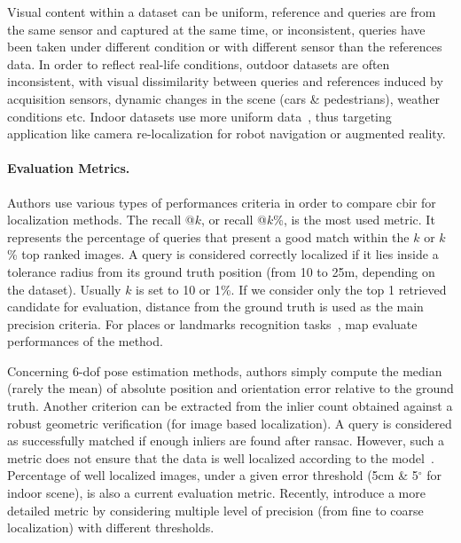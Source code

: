 		Visual content within a dataset can be uniform, reference and queries are from the same sensor and captured at the same time, or inconsistent, queries have been taken under different condition or with different sensor than the references data. In order to reflect real-life conditions, outdoor datasets are often inconsistent, with visual dissimilarity between queries and references induced by acquisition sensors, dynamic changes in the scene (cars \& pedestrians),  weather conditions etc. Indoor datasets use more uniform data~\citep{Shotton2013}, thus targeting application like camera re-localization for robot navigation or augmented reality.

		\paragraph{Evaluation Metrics.}
		\label{subsec:evaluation_metric}
			Authors use various types of performances criteria in order to compare \ac{cbir} for localization methods. The recall @$k$, or recall @$k$\%, is the most used metric. It represents the percentage of queries that present a good match within the $k$ or $k$\% top ranked images. A query is considered correctly localized if it lies inside a tolerance radius from its ground truth position (from 10 to 25m, depending on the dataset).  Usually $k$ is set to 10 or 1\%. If we consider only the top 1 retrieved candidate for evaluation, distance from the ground truth is used as the main precision criteria. For places or landmarks recognition tasks~\citep{Radenovic2018}, \ac{map} evaluate performances of the method.
			
			Concerning 6-\ac{dof} pose estimation methods, authors simply compute the median (rarely the mean) of absolute position and orientation error relative to the ground truth. Another criterion can be extracted from the inlier count obtained against a robust geometric verification (for image based localization). A query is considered as successfully matched if enough inliers are found after \ac{ransac}. However, such a metric does not ensure that the data is well localized according to the model~\citep{Sattler2015}. Percentage of well localized images, \ie under a given error threshold (5cm \& 5$^{\circ}$ for indoor scene), is also a current evaluation metric.  Recently, \citet{Sattler2018} introduce a more detailed metric by considering multiple level of precision (from fine to coarse localization) with different thresholds.
			
	 
			
